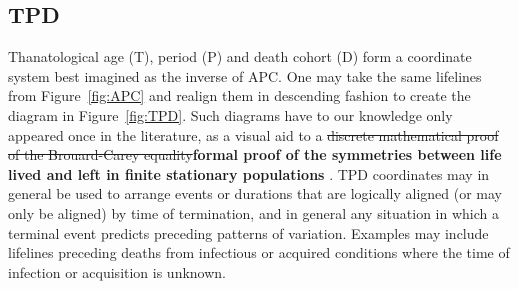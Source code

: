 \documentclass[11pt,oneside,a4paper]{article} %
\newcommand\tgh[1]{\raisebox{-.25\height}{\texttt{[image: Figures/triadtable/triad\#1.pdf]}}}
\begin{document}
\FloatBarrier
\subsection*{TPD}%
\FloatBarrier
Thanatological age (T), period (P) and death cohort (D) form a coordinate system
best imagined as the inverse of APC. One may take the same lifelines from
Figure~\ref{fig:APC} and realign them in descending fashion to create the
diagram in Figure~\ref{fig:TPD}. Such diagrams have to our knowledge only
appeared once in the literature, as a visual aid to a \sout{discrete mathematical
proof of the Brouard-Carey equality}\textbf{formal proof of the symmetries between life lived and left in finite stationary populations}
\citep{pancho2015}. TPD coordinates may in general be used to arrange events or
durations that are logically aligned (or may only be aligned) by time of
termination, and in general any
situation in which a terminal event predicts preceding patterns of variation.
Examples may include lifelines preceding deaths from infectious or acquired
conditions where the time of infection or acquisition is unknown. 
\end{document}
